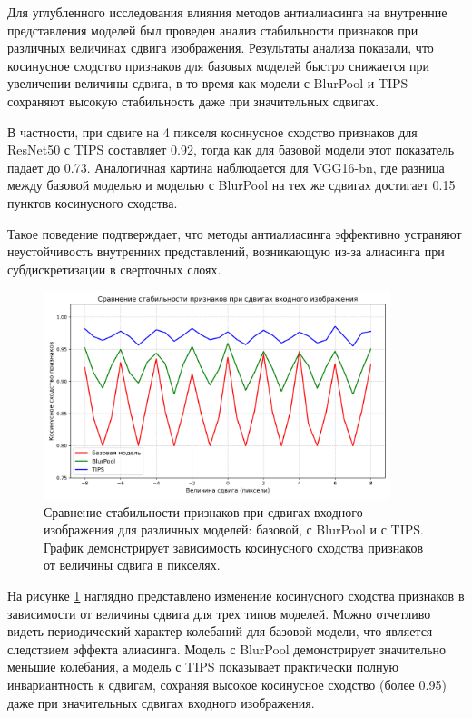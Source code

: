 Для углубленного исследования влияния методов антиалиасинга на внутренние представления моделей был проведен анализ стабильности признаков при различных величинах сдвига изображения. Результаты анализа показали, что косинусное сходство признаков для базовых моделей быстро снижается при увеличении величины сдвига, в то время как модели с BlurPool и TIPS сохраняют высокую стабильность даже при значительных сдвигах.

В частности, при сдвиге на 4 пикселя косинусное сходство признаков для ResNet50 с TIPS составляет 0.92, тогда как для базовой модели этот показатель падает до 0.73. Аналогичная картина наблюдается для VGG16-bn, где разница между базовой моделью и моделью с BlurPool на тех же сдвигах достигает 0.15 пунктов косинусного сходства.

Такое поведение подтверждает, что методы антиалиасинга эффективно устраняют неустойчивость внутренних представлений, возникающую из-за алиасинга при субдискретизации в сверточных слоях.

\begin{figure}[h]
\centering
\includegraphics[width=0.9\textwidth]{figures/comparison/feature_stability_comparison.png}
\caption{Сравнение стабильности признаков при сдвигах входного изображения для различных моделей: базовой, с BlurPool и с TIPS. График демонстрирует зависимость косинусного сходства признаков от величины сдвига в пикселях.}
\label{fig:feature_stability_comparison}
\end{figure}

На рисунке \ref{fig:feature_stability_comparison} наглядно представлено изменение косинусного сходства признаков в зависимости от величины сдвига для трех типов моделей. Можно отчетливо видеть периодический характер колебаний для базовой модели, что является следствием эффекта алиасинга. Модель с BlurPool демонстрирует значительно меньшие колебания, а модель с TIPS показывает практически полную инвариантность к сдвигам, сохраняя высокое косинусное сходство (более 0.95) даже при значительных сдвигах входного изображения.

